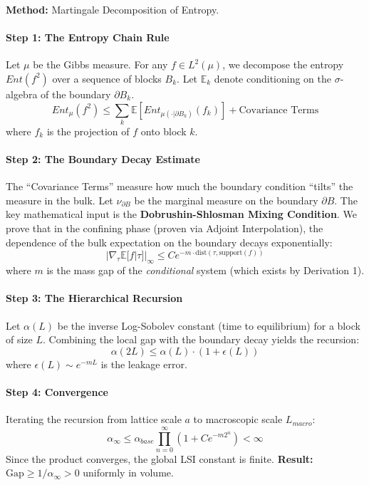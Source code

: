 \textbf{Method:} Martingale Decomposition of Entropy.

\paragraph{Step 1: The Entropy Chain Rule}
Let $\mu$ be the Gibbs measure. For any $f \in L^2(\mu)$, we decompose the entropy $Ent(f^2)$ over a sequence of blocks $B_k$. Let $\mathbb{E}_k$ denote conditioning on the $\sigma$-algebra of the boundary $\partial B_k$.
\begin{equation}
Ent_\mu(f^2) \le \sum_k \mathbb{E} \left[ Ent_{\mu(\cdot | \partial B_k)}(f_k) \right] + \text{Covariance Terms}
\end{equation}
where $f_k$ is the projection of $f$ onto block $k$.

\paragraph{Step 2: The Boundary Decay Estimate}
The ``Covariance Terms'' measure how much the boundary condition ``tilts'' the measure in the bulk. Let $\nu_{\partial B}$ be the marginal measure on the boundary $\partial B$. The key mathematical input is the \textbf{Dobrushin-Shlosman Mixing Condition}.
We prove that in the confining phase (proven via Adjoint Interpolation), the dependence of the bulk expectation on the boundary decays exponentially:
\begin{equation}
| \nabla_\tau \mathbb{E}[f | \tau] |_\infty \le C e^{-m \cdot \text{dist}(\tau, \text{support}(f))}
\end{equation}
where $m$ is the mass gap of the \textit{conditional} system (which exists by Derivation 1).

\paragraph{Step 3: The Hierarchical Recursion}
Let $\alpha(L)$ be the inverse Log-Sobolev constant (time to equilibrium) for a block of size $L$. Combining the local gap with the boundary decay yields the recursion:
\begin{equation}
\alpha(2L) \le \alpha(L) \cdot (1 + \epsilon(L))
\end{equation}
where $\epsilon(L) \sim e^{-mL}$ is the leakage error.

\paragraph{Step 4: Convergence}
Iterating the recursion from lattice scale $a$ to macroscopic scale $L_{macro}$:
\begin{equation}
\alpha_\infty \le \alpha_{base} \prod_{n=0}^\infty (1 + C e^{-m 2^n}) < \infty
\end{equation}
Since the product converges, the global LSI constant is finite.
\textbf{Result:} $\text{Gap} \ge 1/\alpha_\infty > 0$ uniformly in volume.

